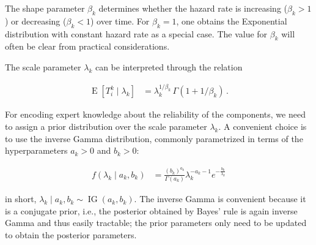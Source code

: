 \documentclass[Journal,SectionNumbers,SingleSpace,InsideFigs]{ascelike}
\newcommand{\E}{\operatorname{E}}
\newcommand{\ig}{\operatorname{IG}}   %
\begin{document}
The shape parameter $\beta_k$ determines whether the hazard rate is increasing ($\beta_k > 1$)
or decreasing ($\beta_k < 1$) over time.
For $\beta_k=1$, one obtains the Exponential distribution with constant hazard rate as a special case.
The value for $\beta_k$ will often be clear from practical considerations.

The scale parameter $\lambda_k$ can be interpreted through the relation
\begin{linenomath*}
\begin{align}
\E[T_i^k \mid \lambda_k] &= \lambda_k^{1/\beta_k}\, \Gamma(1 + 1/\beta_k)\,.
\label{eq:lambdainterpret}
\end{align}
\end{linenomath*}
For encoding expert knowledge about the reliability of the components,
we need to assign a prior distribution over the scale parameter $\lambda_k$.
A convenient choice is to use the inverse Gamma distribution,
commonly parametrized in terms of the hyperparameters $a_k > 0$ and $b_k > 0$:
\begin{linenomath*}
\begin{align}
f(\lambda_k\mid a_k,b_k) &= \frac{(b_k)^{a_k}}{\Gamma(a_k)} \lambda_k^{-a_k -1} e^{-\frac{b_k}{\lambda_k}}
\label{eq:ig-def}
\end{align}
\end{linenomath*}
in short, $\lambda_k \mid a_k, b_k \sim \ig(a_k,b_k)$.
The inverse Gamma is convenient because it is a conjugate prior,
i.e., the posterior obtained by Bayes' rule is again inverse Gamma and thus easily tractable;
the prior parameters only need to be updated to obtain the posterior parameters.
\end{document}
